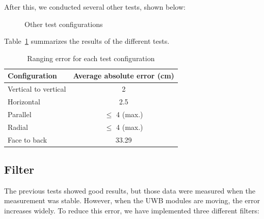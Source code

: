 \documentclass[conference]{IEEEtran}
\begin{document}
After this, we conducted several other tests, shown below:
\begin{figure}[H]
    \centering
    \begin{minipage}{0.48\linewidth}
        \centering
        \resizebox{\linewidth}{!}{\FtFhorizontale}
        \label{fig:FtFHorizontal}
    \end{minipage}\hfill
    \begin{minipage}{0.48\linewidth}
        \centering
        \resizebox{\linewidth}{!}{\SchemaParalleles}
        \label{fig:Paralleles}
    \end{minipage}

    \vspace{1em}

    \begin{minipage}{0.48\linewidth}
        \centering
        \resizebox{\linewidth}{!}{\Schemarayon}
        \label{fig:Rayon}
    \end{minipage}\hfill
    \begin{minipage}{0.48\linewidth}
        \centering
        \resizebox{\linewidth}{!}{\FtB}
        \label{fig:FtB}
    \end{minipage}
    \caption{Other test configurations}
    \label{fig:OtherTests}
\end{figure}
Table~\ref{tab:uwb_tests} summarizes the results of the different tests.

\begin{table}[!t]
\caption{Ranging error for each test configuration}
\label{tab:uwb_tests}
\centering
\begin{tabular}{|l|c|}
\hline
\textbf{Configuration} & \textbf{Average absolute error (cm)} \\
\hline
Vertical to vertical & 2 \\
Horizontal & 2.5 \\
Parallel & $\leq$ 4 (max.) \\
Radial & $\leq$ 4 (max.) \\
Face to back & 33.29 \\
\hline
\end{tabular}
\end{table}

\subsection{Filter}
The previous tests showed good results, but those data were measured when the
measurement was stable. However, when the UWB modules are moving, the error
increases widely. To reduce this error, we have implemented three different
filters:
\end{document}
